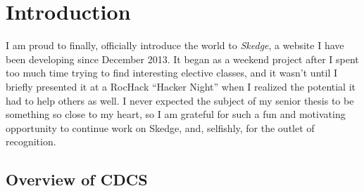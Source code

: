 
\chapter{Introduction}

\vspace{-20pt}

I am proud to finally, officially introduce the world to \emph{Skedge}, a website I have been developing since December 2013. It began as a weekend project after I spent too much time trying to find interesting elective classes, and it wasn't until I briefly presented it at a RocHack ``Hacker Night'' when I realized the potential it had to help others as well. I never expected the subject of my senior thesis to be something so close to my heart, so I am grateful for such a fun and motivating opportunity to continue work on Skedge, and, selfishly, for the outlet of recognition.

\section{Overview of CDCS}

